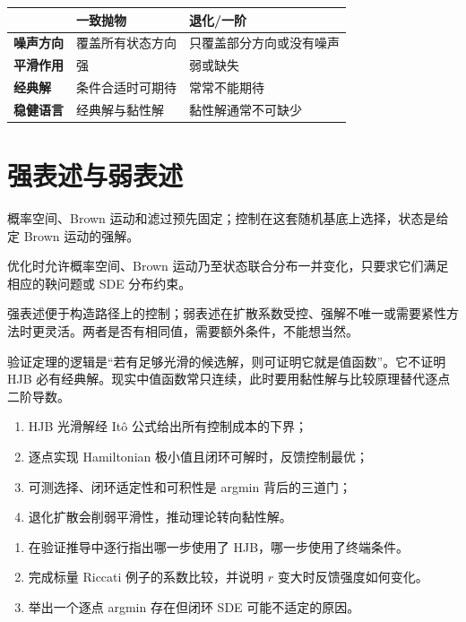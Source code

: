 \begin{tcolorbox}[colback=NightPanelTwo,colframe=GridLine]
\begin{tabularx}{\textwidth}{@{}>{\sffamily\bfseries\color{BlueAccent}}p{}YY@{}}
\toprule
 & \textcolor{GreenAccent}{一致抛物} & \textcolor{YellowAccent}{退化/一阶} \\
\midrule
噪声方向 & 覆盖所有状态方向 & 只覆盖部分方向或没有噪声 \\
平滑作用 & 强 & 弱或缺失 \\
经典解 & 条件合适时可期待 & 常常不能期待 \\
稳健语言 & 经典解与黏性解 & 黏性解通常不可缺少 \\
\bottomrule
\end{tabularx}
\end{tcolorbox}

\section{强表述与弱表述}

\begin{definition}[强控制问题]
概率空间、Brown 运动和滤过预先固定；控制在这套随机基底上选择，状态是给定 Brown 运动的强解。
\end{definition}

\begin{definition}[弱控制问题]
优化时允许概率空间、Brown 运动乃至状态联合分布一并变化，只要求它们满足相应的鞅问题或 SDE 分布约束。
\end{definition}

强表述便于构造路径上的控制；弱表述在扩散系数受控、强解不唯一或需要紧性方法时更灵活。两者是否有相同值，需要额外条件，不能想当然。

\begin{pitfall}[验证定理不负责制造光滑性]
验证定理的逻辑是“若有足够光滑的候选解，则可证明它就是值函数”。它不证明 HJB 必有经典解。现实中值函数常只连续，此时要用黏性解与比较原理替代逐点二阶导数。
\end{pitfall}

\begin{takeaway}
\begin{enumerate}
  \item HJB 光滑解经 Itô 公式给出所有控制成本的下界；
  \item 逐点实现 Hamiltonian 极小值且闭环可解时，反馈控制最优；
  \item 可测选择、闭环适定性和可积性是 argmin 背后的三道门；
  \item 退化扩散会削弱平滑性，推动理论转向黏性解。
\end{enumerate}
\end{takeaway}

\begin{exercisebox}
\begin{enumerate}
  \item 在验证推导中逐行指出哪一步使用了 HJB，哪一步使用了终端条件。
  \item 完成标量 Riccati 例子的系数比较，并说明 $r$ 变大时反馈强度如何变化。
  \item 举出一个逐点 argmin 存在但闭环 SDE 可能不适定的原因。
\end{enumerate}
\end{exercisebox}
